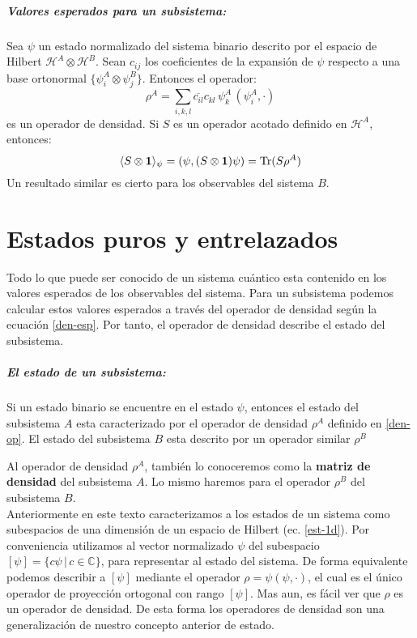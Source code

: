 \documentclass[12pt]{book}
\numberwithin{equation}{chapter}
\def\ol{\overline}
\def\C{\mathbb{C}}
\def\la{\langle}
\def\ra{\rangle}
\def\H{\mathcal{H}}
\def\pr{\otimes}
\def\1{\mathbf{1}}
\def\Tr{\hbox{Tr}}
\begin{document}
\paragraph{Valores esperados para un subsistema:} Sea $\psi$ un estado normalizado del sistema binario descrito por el espacio de Hilbert $\H^{A} \pr \H^{B}$. Sean $c_{ij}$ los coeficientes de la expansi\'on de $\psi$ respecto a una base ortonormal $\{ \psi_{i}^{A} \pr \psi_{j}^{B} \}$. Entonces el operador:
\begin{equation}\label{den-op}
\rho^{A}= \sum_{i,k,l} \ol{c_{il}} c_{kl}\, \psi_{k}^{A}\, ( \psi_{i}^{A}, \cdot )
\end{equation} 
es un operador de densidad. Si $S$ es un operador acotado definido en $\H^{A}$, entonces:
\begin{equation}\label{den-esp}
\la S \pr \1 \ra_{\psi}= ( \psi , (S \pr \1)\psi )= \Tr (S \rho^{A})
\end{equation}
Un resultado similar es cierto para los observables del sistema $B$.
\rightline{$\dag$}



\chapter{Estados puros y entrelazados}
Todo lo que puede ser conocido de un sistema cu\'antico esta contenido en los valores esperados de los observables del sistema. Para un subsistema podemos calcular estos valores esperados a trav\'es del operador de densidad seg\'un la ecuaci\'on \eqref{den-esp}. Por tanto, el operador de densidad describe el estado del subsistema.

\paragraph{El estado de un subsistema:} Si un estado binario se encuentre en el estado $\psi$, entonces el estado del subsistema $A$ esta caracterizado por el operador de densidad $\rho^{A}$ definido en \eqref{den-op}. El estado del subsistema $B$ esta descrito por un operador similar $\rho^{B}$ 

\rightline{$\dag$}
\vspace{3 mm}

Al operador de densidad $\rho^{A}$, tambi\'en lo conoceremos como la {\bf matriz de densidad} del subsistema $A$. Lo mismo haremos para el operador $\rho^{B}$ del subsistema $B$.\\ 

Anteriormente en este texto caracterizamos a los estados de un sistema como subespacios de una dimensi\'on de un espacio de Hilbert (ec. \eqref{est-1d}). Por conveniencia utilizamos al vector normalizado $\psi$ del subespacio $ [\psi]= \{c \psi \,|\, c \in \C \} $, para representar al estado del sistema. De forma equivalente podemos describir a $[\psi]$ mediante el operador $\rho = \psi ( \psi ,\cdot )$, el cual es el \'unico operador de proyecci\'on ortogonal con rango $[\psi]$. Mas aun, es f\'acil ver que $\rho$ es un operador de densidad. De esta forma los operadores de densidad son una generalizaci\'on de nuestro concepto anterior de estado.
\end{document}
